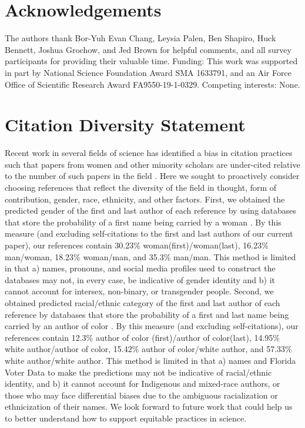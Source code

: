 \documentclass[reprint, twocolumn, aps, nofootinbib, superscriptaddress, longbibliography]{revtex4-1}
\begin{document}
\section{Acknowledgements} \label{sec:acknowledgements}

The authors thank Bor-Yuh Evan Chang, Leysia Palen, Ben Shapiro, Huck Bennett, Joshua Grochow, and Jed Brown for helpful comments, and all survey participants for providing their valuable time. Funding: This work was supported in part by National Science Foundation Award SMA 1633791, and an Air Force Office of Scientific Research Award FA9550-19-1-0329. Competing interests: None.

\section{Citation Diversity Statement} \label{sec:diversity_statement}
Recent work in several fields of science has identified a bias in citation practices such that papers from women and other minority scholars are under-cited relative to the number of such papers in the field \cite{mitchell2013gendered,dion2018gendered,caplar2017quantitative, maliniak2013gender, Dworkin2020.01.03.894378, bertolero2021racial, wang2021gendered, chatterjee2021gender, fulvio2021imbalance}. Here we sought to proactively consider choosing references that reflect the diversity of the field in thought, form of contribution, gender, race, ethnicity, and other factors. First, we obtained the predicted gender of the first and last author of each reference by using databases that store the probability of a first name being carried by a woman \cite{Dworkin2020.01.03.894378,zhou_dale_2020_3672110}. By this measure (and excluding self-citations to the first and last authors of our current paper), our references contain 30.23\% woman(first)/woman(last), 16.23\% man/woman, 18.23\% woman/man, and 35.3\% man/man. This method is limited in that a) names, pronouns, and social media profiles used to construct the databases may not, in every case, be indicative of gender identity and b) it cannot account for intersex, non-binary, or transgender people. Second, we obtained predicted racial/ethnic category of the first and last author of each reference by databases that store the probability of a first and last name being carried by an author of color \cite{ambekar2009name, sood2018predicting}. By this measure (and excluding self-citations), our references contain 12.3\% author of color (first)/author of color(last), 14.95\% white author/author of color, 15.42\% author of color/white author, and 57.33\% white author/white author. This method is limited in that a) names and Florida Voter Data to make the predictions may not be indicative of racial/ethnic identity, and b) it cannot account for Indigenous and mixed-race authors, or those who may face differential biases due to the ambiguous racialization or ethnicization of their names. We look forward to future work that could help us to better understand how to support equitable practices in science. 
\end{document}
